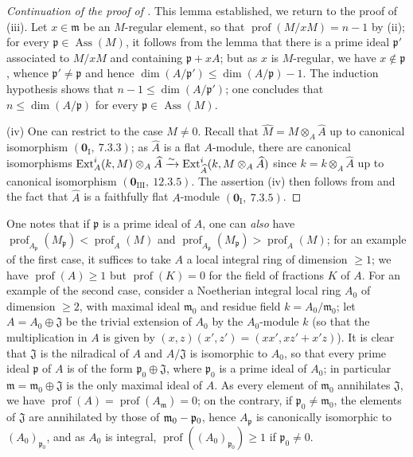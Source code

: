 \begin{proof}[Continuation of the proof of ]
This lemma established, we return to the proof of (iii).
Let $x\in\mathfrak{m}$ be an $M$-regular element, so that $\operatorname{prof}(M/x M)=n-1$ by (ii); for every $\mathfrak{p}\in\operatorname{Ass}(M)$, it follows from the lemma that there is a prime ideal $\mathfrak{p}'$ associated to $M/x M$ and containing $\mathfrak{p}+x A$; but as $x$ is $M$-regular, we have $x\notin\mathfrak{p}$, whence $\mathfrak{p}'\neq\mathfrak{p}$ and hence $\dim(A/\mathfrak{p}')\leq\dim(A/\mathfrak{p})-1$.
The induction hypothesis shows that $n-1\leq\dim(A/\mathfrak{p}')$; one concludes that $n\leq\dim(A/\mathfrak{p})$ for every $\mathfrak{p}\in\operatorname{Ass}(M)$.

(iv) One can restrict to the case $M\neq 0$.
Recall that $\widehat{M}=M\otimes_A\widehat{A}$ up to canonical isomorphism $(\mathbf{0}_\mathrm{I},~7.3.3)$; as $\widehat{A}$ is a flat $A$-module, there are canonical isomorphisms $\operatorname{Ext}^i_A(k,M)\otimes_A\widehat{A}\xrightarrow{\sim}\operatorname{Ext}^i_{\widehat{A}}(k,M\otimes_A\widehat{A})$ since $k=k\otimes_A\widehat{A}$ up to canonical isomorphism $(\mathbf{0}_\mathrm{III},~12.3.5)$.
The assertion (iv) then follows from  and the fact that $\widehat{A}$ is a faithfully flat $A$-module $(\mathbf{0}_\mathrm{I},~7.3.5)$.
\end{proof}

\begin{env}[16.4.6.4]
\label{0.16.4.6.4}
One notes that if $\mathfrak{p}$ is a prime ideal of $A$, one can \emph{also} have $\operatorname{prof}_{A_\mathfrak{p}}(M_\mathfrak{p})<\operatorname{prof}_A(M)$ and $\operatorname{prof}_{A_\mathfrak{p}}(M_\mathfrak{p})>\operatorname{prof}_A(M)$; for an example of the first case,
it suffices to take $A$ a local integral ring of dimension $\geq 1$; we have $\operatorname{prof}(A)\geq 1$ but $\operatorname{prof}(K)=0$ for the field of fractions $K$ of $A$.
For an example of the second case, consider a Noetherian integral local ring $A_0$ of dimension $\geq 2$, with maximal ideal $\mathfrak{m}_0$ and residue field $k=A_0/\mathfrak{m}_0$; let $A=A_0\oplus\mathfrak{J}$ be the trivial extension of $A_0$ by the $A_0$-module $k$ (so that the multiplication in $A$ is given by $(x,z)(x',z')=(xx',xz'+x'z)$).
It is clear that $\mathfrak{J}$ is the nilradical of $A$ and $A/\mathfrak{J}$ is isomorphic to $A_0$, so that every prime ideal $\mathfrak{p}$ of $A$ is of the form $\mathfrak{p}_0\oplus\mathfrak{J}$, where $\mathfrak{p}_0$ is a prime ideal of $A_0$; in particular $\mathfrak{m}=\mathfrak{m}_0\oplus\mathfrak{J}$ is the only maximal ideal of $A$.
As every element of $\mathfrak{m}_0$ annihilates $\mathfrak{J}$, we have $\operatorname{prof}(A)=\operatorname{prof}(A_\mathfrak{m})=0$; on the contrary, if $\mathfrak{p}_0\neq\mathfrak{m}_0$, the elements of $\mathfrak{J}$ are annihilated by those of $\mathfrak{m}_0-\mathfrak{p}_0$, hence $A_\mathfrak{p}$ is canonically isomorphic to $(A_0)_{\mathfrak{p}_0}$, and as $A_0$ is integral, $\operatorname{prof}((A_0)_{\mathfrak{p}_0})\geq 1$ if $\mathfrak{p}_0\neq 0$.
\end{env}

